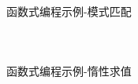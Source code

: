 \documentclass[UTF8,aspectratio=169]{beamer}
\begin{document}
\begin{frame}[fragile]{函数式编程示例-模式匹配}
    \begin{columns}
        \begin{column}{0.48\textwidth}
            \inputminted[firstline=1,lastline=18]{cpp}{code/functional_programming_8.cpp}
        \end{column}
        \begin{column}{0.48\textwidth}
            \inputminted[firstline=19,lastline=33]{cpp}{code/functional_programming_8.cpp}
        \end{column}
    \end{columns}
\end{frame}

\begin{frame}[fragile]{函数式编程示例-惰性求值}
    \begin{columns}
        \begin{column}{0.48\textwidth}
            \inputminted[firstline=1,lastline=21]{cpp}{code/functional_programming_9.cpp}
        \end{column}
        \begin{column}{0.48\textwidth}
            \inputminted[firstline=22,lastline=37]{cpp}{code/functional_programming_9.cpp}
        \end{column}
    \end{columns}
\end{frame}
\end{document}
